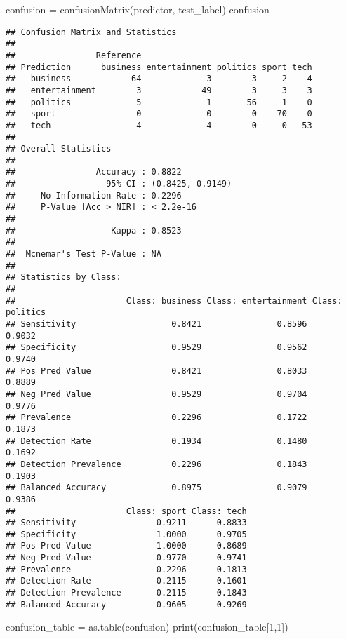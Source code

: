 \documentclass[
]{article}
\newenvironment{Shaded}{\begin{snugshade}}{\end{snugshade}}
\newcommand{\DecValTok}[1]{\textcolor[rgb]{0.00,0.00,0.81}{#1}}
\newcommand{\FunctionTok}[1]{\textcolor[rgb]{0.00,0.00,0.00}{#1}}
\newcommand{\NormalTok}[1]{#1}
\newcommand{\OtherTok}[1]{\textcolor[rgb]{0.56,0.35,0.01}{#1}}
\begin{document}
\begin{Shaded}
\begin{Highlighting}[]
\NormalTok{confusion }\OtherTok{=} \FunctionTok{confusionMatrix}\NormalTok{(predictor, test\_label)}
\NormalTok{confusion}
\end{Highlighting}
\end{Shaded}

\begin{verbatim}
## Confusion Matrix and Statistics
## 
##                Reference
## Prediction      business entertainment politics sport tech
##   business            64             3        3     2    4
##   entertainment        3            49        3     3    3
##   politics             5             1       56     1    0
##   sport                0             0        0    70    0
##   tech                 4             4        0     0   53
## 
## Overall Statistics
##                                           
##                Accuracy : 0.8822          
##                  95% CI : (0.8425, 0.9149)
##     No Information Rate : 0.2296          
##     P-Value [Acc > NIR] : < 2.2e-16       
##                                           
##                   Kappa : 0.8523          
##                                           
##  Mcnemar's Test P-Value : NA              
## 
## Statistics by Class:
## 
##                      Class: business Class: entertainment Class: politics
## Sensitivity                   0.8421               0.8596          0.9032
## Specificity                   0.9529               0.9562          0.9740
## Pos Pred Value                0.8421               0.8033          0.8889
## Neg Pred Value                0.9529               0.9704          0.9776
## Prevalence                    0.2296               0.1722          0.1873
## Detection Rate                0.1934               0.1480          0.1692
## Detection Prevalence          0.2296               0.1843          0.1903
## Balanced Accuracy             0.8975               0.9079          0.9386
##                      Class: sport Class: tech
## Sensitivity                0.9211      0.8833
## Specificity                1.0000      0.9705
## Pos Pred Value             1.0000      0.8689
## Neg Pred Value             0.9770      0.9741
## Prevalence                 0.2296      0.1813
## Detection Rate             0.2115      0.1601
## Detection Prevalence       0.2115      0.1843
## Balanced Accuracy          0.9605      0.9269
\end{verbatim}

\begin{Shaded}
\begin{Highlighting}[]
\NormalTok{confusion\_table }\OtherTok{=} \FunctionTok{as.table}\NormalTok{(confusion)}
\FunctionTok{print}\NormalTok{(confusion\_table[}\DecValTok{1}\NormalTok{,}\DecValTok{1}\NormalTok{])}
\end{Highlighting}
\end{Shaded}
\end{document}
